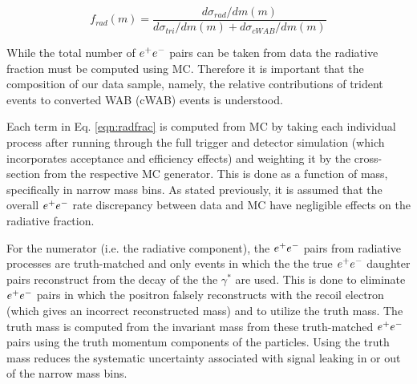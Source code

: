 \begin{equation}
f_{rad}(m)=\frac{d\sigma_{rad}/dm(m)}{d\sigma_{tri}/dm(m)+d\sigma_{cWAB}/dm(m)}
\label{eqn:radfrac}
\end{equation}

While the total number of $e^{+}e^{-}$ pairs can be taken from data the radiative fraction must be computed using MC. Therefore it is important that the composition of our data sample, namely, the relative contributions of trident events to converted WAB (cWAB) events is understood. 

Each term in Eq. \ref{eqn:radfrac} is computed from MC by taking each individual process after running through the full trigger and detector simulation (which incorporates acceptance and efficiency effects) and weighting it by the cross-section from the respective MC generator. This is done as a function of mass, specifically in narrow mass bins. As stated previously, it is assumed that the overall $e^{+}e^{-}$ rate discrepancy between data and MC have negligible effects on the radiative fraction.


For the numerator (i.e. the radiative component), the $e^{+}e^{-}$ pairs from radiative processes are truth-matched and only events in which the the true $e^{+}e^{-}$ daughter pairs reconstruct from the decay of the the $\gamma^*$ are used. This is done to eliminate $e^{+}e^{-}$ pairs in which the positron falsely reconstructs with the recoil electron (which gives an incorrect reconstructed mass) and to utilize the truth mass. The truth mass is computed from the invariant mass from these truth-matched $e^{+}e^{-}$ pairs using the truth momentum components of the particles. Using the truth mass reduces the systematic uncertainty associated with signal leaking in or out of the narrow mass bins. 


